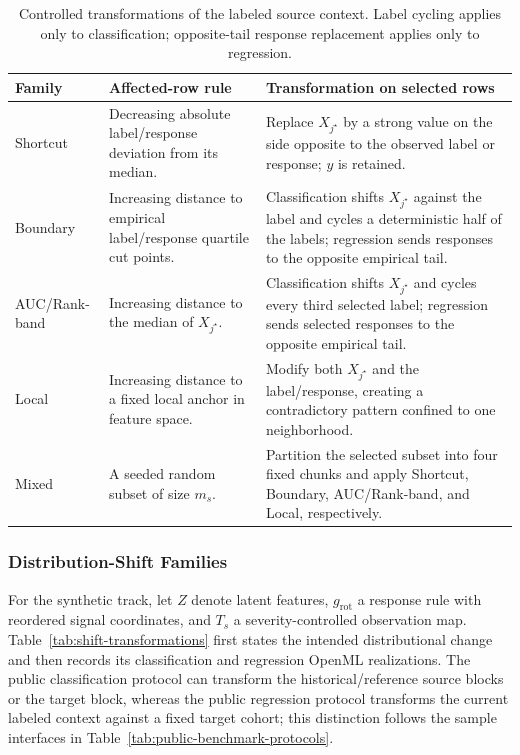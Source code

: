 \begin{table}[H]
  \caption{Controlled transformations of the labeled source context.  Label
  cycling applies only to classification; opposite-tail response replacement
  applies only to regression.}
  \label{tab:context-perturbation-transformations}
  \centering
  \footnotesize
  \setlength{\tabcolsep}{3pt}
  \begin{tabular}{@{}>{\raggedright\arraybackslash}p{} >{\raggedright\arraybackslash}p{} >{\raggedright\arraybackslash}p{}@{}}
    \toprule
    Family & Affected-row rule & Transformation on selected rows \\
    \midrule
    Shortcut
      & Decreasing absolute label/response deviation from its median.
      & Replace $X_{j^\star}$ by a strong value on the side opposite to the
        observed label or response; $y$ is retained. \\
    Boundary
      & Increasing distance to empirical label/response quartile cut points.
      & Classification shifts $X_{j^\star}$ against the label and cycles a
        deterministic half of the labels; regression sends responses to the
        opposite empirical tail. \\
    AUC/Rank-band
      & Increasing distance to the median of $X_{j^\star}$.
      & Classification shifts $X_{j^\star}$ and cycles every third selected
        label; regression sends selected responses to the opposite empirical
        tail. \\
    Local
      & Increasing distance to a fixed local anchor in feature space.
      & Modify both $X_{j^\star}$ and the label/response, creating a
        contradictory pattern confined to one neighborhood. \\
    Mixed
      & A seeded random subset of size $m_s$.
      & Partition the selected subset into four fixed chunks and apply
        Shortcut, Boundary, AUC/Rank-band, and Local, respectively. \\
    \bottomrule
  \end{tabular}
\end{table}

\subsubsection{Distribution-Shift Families}

For the synthetic track, let $Z$ denote latent features,
$g_{\mathrm{rot}}$ a response rule with reordered signal coordinates, and
$T_s$ a severity-controlled observation map.  Table~\ref{tab:shift-transformations}
first states the intended distributional change and then records its
classification and regression OpenML realizations.  The public classification
protocol can transform the historical/reference source blocks or the target
block, whereas the public regression protocol transforms the current labeled
context against a fixed target cohort; this distinction follows the sample
interfaces in Table~\ref{tab:public-benchmark-protocols}.

